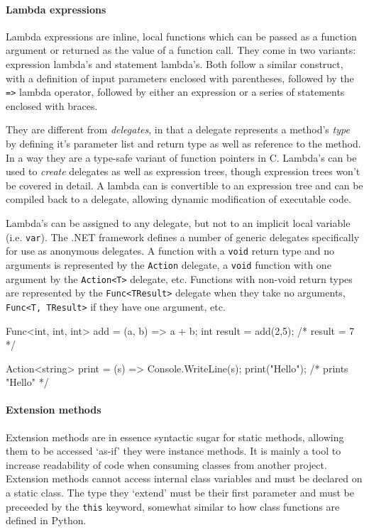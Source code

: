 \documentclass[twoside,openright]{uva-bachelor-thesis}
\newcommand{\code}[1]{\texttt{\footnotesize#1}}
\begin{document}
		\paragraph{Lambda expressions}
			Lambda expressions are inline, local functions which can be passed as a function argument or returned as the value of a function call. They come in two variants: expression lambda's and statement lambda's. Both follow a similar construct, with a definition of input parameters enclosed with parentheses, followed by the \code{=>} lambda operator, followed by either an expression or a series of statements enclosed with braces.
			
			They are different from \emph{delegates}, in that a delegate represents a method's \emph{type} by defining it's parameter list and return type as well as reference to the method. In a way they are a type-safe variant of function pointers in C. Lambda's can be used to \emph{create} delegates as well as expression trees, though expression trees won't be covered in detail. A lambda can is convertible to an expression tree and can be compiled back to a delegate, allowing dynamic modification of executable code.
			
			Lambda's can be assigned to any delegate, but not to an implicit local variable (i.e. \code{var}). The .NET framework defines a number of generic delegates specifically for use as anonymous delegates. A function with a \code{void} return type and no arguments is represented by the \code{Action} delegate, a \code{void} function with one argument by the \code{Action<T>} delegate, etc. Functions with non-void return types are represented by the \code{Func<TResult>} delegate when they take no arguments, \code{Func<T, TResult>} if they have one argument, etc.
			
			\begin{codespan}
				\begin{csharpcode}
					Func<int, int, int> add = (a, b) => a + b;
					int result = add(2,5);     /* result = 7 */
					
					Action<string> print = (s) => Console.WriteLine(s);
					print("Hello");            /* prints "Hello" */
				\end{csharpcode}
			\end{codespan}
			
		\paragraph{Extension methods}
			Extension methods are in essence syntactic sugar for static methods, allowing them to be accessed `as-if' they were instance methods. It is mainly a tool to increase readability of code when consuming classes from another project. Extension methods cannot access internal class variables and must be declared on a static class. The type they `extend' must be their first parameter and must be preceeded by the \code{this} keyword, somewhat similar to how class functions are defined in Python.
			
\end{document}

